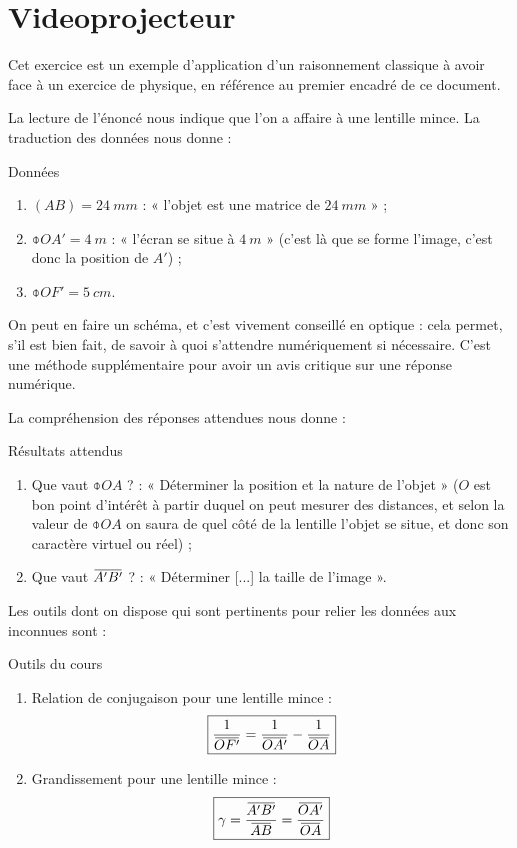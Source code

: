 \documentclass[10pt,a5paper,notitlepage]{book}
\begin{document}
\section{Videoprojecteur}\label{ssec:vp}
Cet exercice est un exemple d'application d'un raisonnement classique à avoir
face à un exercice de physique, en référence au premier encadré de ce document.
\bigbreak

La lecture de l'énoncé nous indique que l'on a affaire à une lentille mince. La
traduction des données nous donne :

\begin{NCdefi}{Données}
    \begin{enumerate}
        \item $(AB) = \SI{24}{mm}$ : « l'objet est une matrice de $ \SI{24}{mm}$
            » ;
        \item $ \obar{OA'} = \SI{+4}{m}$ : « l'écran se situe à $\SI{4}{m}$ »
            (c'est là que se forme l'image, c'est donc la position de $A'$) ;
        \item $ \obar{OF'} = \SI{+5}{cm}$.
    \end{enumerate}
\end{NCdefi}

On peut en faire un schéma, et c'est vivement conseillé en optique : cela
permet, s'il est bien fait, de savoir à quoi s'attendre numériquement si
nécessaire. C'est une méthode supplémentaire pour avoir un avis critique sur une
réponse numérique. \smallbreak

La compréhension des réponses attendues nous donne :
\begin{NCprop}{Résultats attendus}
    \begin{enumerate}
        \item Que vaut $ \obar{OA}$ ? : « Déterminer la position et la nature de
            l'objet » ($O$ est bon point d'intérêt à partir duquel on peut
            mesurer des distances, et selon la valeur  de
            $\obar{OA}$ on saura de quel côté de la lentille l'objet se situe,
            et donc son caractère virtuel ou réel) ;
        \item Que vaut $\ABp$ ? : « Déterminer [...] la taille de l'image ».
    \end{enumerate}
\end{NCprop}

Les outils dont on dispose qui sont pertinents pour relier les données aux
inconnues sont :
\begin{NCdemo}{Outils du cours}
    \begin{enumerate}
        \item Relation de conjugaison pour une lentille mince :
            \[ \boxed{ \frac{1}{\OF} = \frac{1}{\OAp} - \frac{1}{\OA}}\]
        \item Grandissement pour une lentille mince :
            \[\boxed{\g = \frac{\ABp}{\ABb} = \frac{\OAp}{\OA}}\]
    \end{enumerate}
\end{NCdemo}
\end{document}
